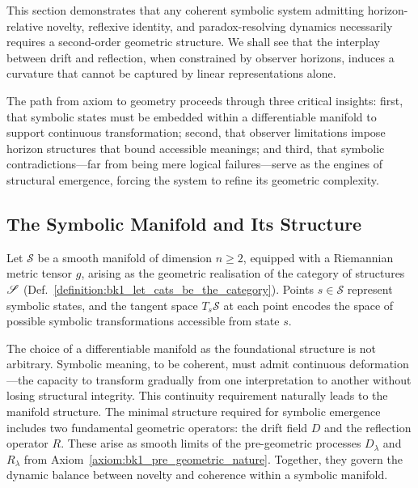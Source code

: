 This section demonstrates that any coherent symbolic system admitting horizon-relative novelty, reflexive identity, and paradox-resolving dynamics necessarily requires a second-order geometric structure. We shall see that the interplay between drift and reflection, when constrained by observer horizons, induces a curvature that cannot be captured by linear representations alone.

The path from axiom to geometry proceeds through three critical insights: first, that symbolic states must be embedded within a differentiable manifold to support continuous transformation; second, that observer limitations impose horizon structures that bound accessible meanings; and third, that symbolic contradictions—far from being mere logical failures—serve as the engines of structural emergence, forcing the system to refine its geometric complexity.

\subsection{The Symbolic Manifold and Its Structure}
\label{subsec:bk1_symbolic_manifold_structure}

\begin{definition}
\label{definition:bk1_symbolic_manifold}
Let $\mathcal{S}$ be a smooth manifold of dimension $n \geq 2$, equipped with a Riemannian metric tensor $g$, arising as the geometric realisation of the category of structures $\mathscr{S}$ (Def.~\ref{definition:bk1_let_cats_be_the_category}). Points $s \in \mathcal{S}$ represent symbolic states, and the tangent space $T_s\mathcal{S}$ at each point encodes the space of possible symbolic transformations accessible from state $s$.
\end{definition}

The choice of a differentiable manifold as the foundational structure is not arbitrary. Symbolic meaning, to be coherent, must admit continuous deformation—the capacity to transform gradually from one interpretation to another without losing structural integrity. This continuity requirement naturally leads to the manifold structure.
The minimal structure required for symbolic emergence includes two fundamental geometric operators: the drift field \( D \) and the reflection operator \( R \). These arise as smooth limits of the pre-geometric processes \( D_\lambda \) and \( R_\lambda \) from Axiom~\ref{axiom:bk1_pre_geometric_nature}. Together, they govern the dynamic balance between novelty and coherence within a symbolic manifold.

